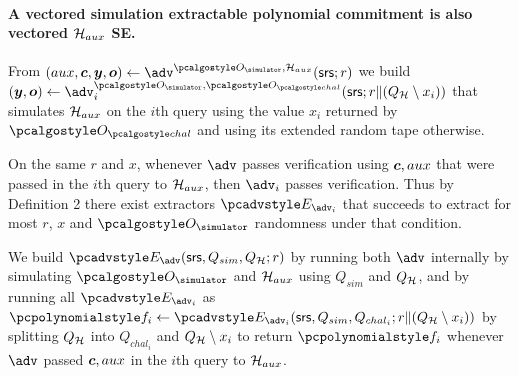 \documentclass[runningheads,11pt]{llncs}
\let\spvec\vec
\let\vec\accentvec
\let\spvec\vec
\let\vec\spvec
\def\vec#1{\mathchoice{\mbox{\boldmath$\displaystyle#1$}}
  {\mbox{\boldmath$\textstyle#1$}} {\mbox{\boldmath$\scriptstyle#1$}}
  {\mbox{\boldmath$\scriptscriptstyle#1$}}}
\begin{document}
\paragraph{A vectored simulation extractable polynomial commitment is also vectored $\mathcal{H}_{aux}$ SE.}
From $(aux, \vec{c}, \vec{y}, \vec{o}) \gets \adv^{\oracles,\ro_{aux}}(\srs; r)$ we build $(\vec{y},\vec{o}) \gets \adv_{i}^{\oracles,\oraclec}(\srs; r\|(Q_{\ro}\setminus x_{i}))$ that simulates $\mathcal{H}_{aux}$ on the $i$th query using the value $x_{i}$ returned by $\oraclec$ and using its extended random tape otherwise.

On the same $r$ and $x$, whenever $\adv$ passes verification using $\vec{c},aux$ that were passed in the $i$th query to $\mathcal{H}_{aux}$, then $\adv_{i}$ passes verification.  Thus by Definition 2 there exist extractors $\Ext_{\adv_{i}}$ that succeeds to extract for most $r$, $x$ and $\oracles$ randomness under that condition.

We build $\Ext_{\adv}(\srs, Q_{sim}, Q_{\ro}; r)$ by running both $\adv$
internally by simulating $\oracles$ and $\mathcal{H}_{aux}$ using $Q_{sim}$ and
$Q_{\mathcal{H}}$, and by running all $\Ext_{\adv_{i}}$ as $\p{f}_{i}\gets
\Ext_{\adv_{i}}(\srs,Q_{sim},Q_{chal_{i}}; r\|(Q_{\ro}\setminus x_{i}))$ by
splitting $Q_{\mathcal{H}}$ into $Q_{chal_{i}}$ and $Q_{\mathcal{H}}\setminus x_{i}$ to return
$\p{f}_{i}$ whenever $\adv$ passed $\vec{c},aux$ in the $i$th query to
$\mathcal{H}_{aux}$.
\end{document}
